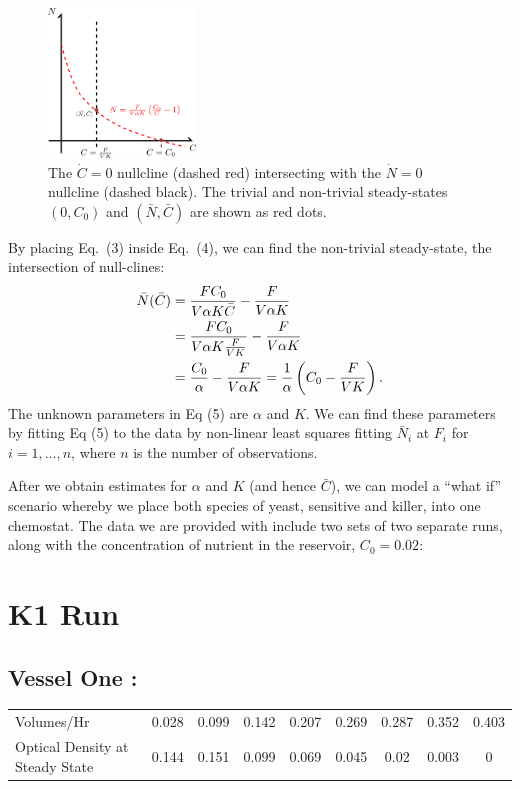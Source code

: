 \begin{multicols}{2}
\begin{figure}[H]
  \centering
    \includegraphics[width=0.35\textwidth]{images/drawing.png}
  \caption{\footnotesize The $\dot{C} = 0$ nullcline (dashed red) intersecting with the $\dot{N} = 0$ nullcline (dashed black).  The trivial and non-trivial steady-states $(0, C_0)$ and $(\bar{N}, \bar{C})$ are shown as red dots.}
\end{figure}
\vfill
\columnbreak
By placing Eq.\ (3) inside Eq.\ (4), we can find the non-trivial steady-state, the intersection of null-clines:
\begin{align}
  \bar{N}(\bar{C}) &= \frac{FC_0}{V \alpha K \bar{C}} - \frac{F}{V \alpha K}  \notag \\
  &= \frac{FC_0}{V \alpha K \frac{F}{VK}} - \frac{F}{V \alpha K} \notag \\
  &= \frac{C_0}{\alpha} - \frac{F}{V \alpha K} = \frac{1}{\alpha} \left( C_0 - \frac{F}{VK} \right).
\end{align}
The unknown parameters in Eq (5) are $\alpha$ and $K$.  We can find these parameters by fitting Eq (5) to the data by non-linear least squares fitting $\bar{N}_i$ at $F_i$ for $i = 1,\ldots,n$, where $n$ is the number of observations.
\end{multicols}

After we obtain estimates for $\alpha$ and $K$ (and hence $\bar{C}$), we can model a ``what if'' scenario whereby we place both species of yeast, sensitive and killer, into one chemostat.  The data we are provided with include two sets of two separate runs, along with the concentration of nutrient in the reservoir, $C_0 = 0.02$:
\section{K1 Run}
\subsection*{Vessel One :}
\begin{center}
\begin{tabular}{l|cccccccc}
  Volumes/Hr & 0.028 & 0.099 & 0.142 & 0.207 & 0.269 & 0.287 & 0.352 & 0.403 \\
  Optical Density at Steady State & 0.144 & 0.151 & 0.099 & 0.069 & 0.045 & 0.02 & 0.003 & 0 \\
\end{tabular}
\end{center}

